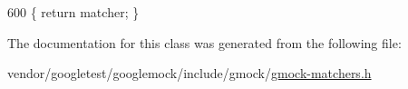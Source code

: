 \begin{DoxyCode}
600 \{ \textcolor{keywordflow}{return} matcher; \}
\end{DoxyCode}


The documentation for this class was generated from the following file\+:\begin{DoxyCompactItemize}
\item 
vendor/googletest/googlemock/include/gmock/\hyperlink{gmock-matchers_8h}{gmock-\/matchers.\+h}\end{DoxyCompactItemize}
